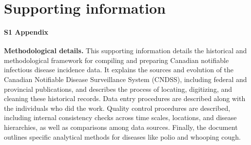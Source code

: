 \documentclass[10pt,letterpaper]{article}
\begin{document}
\section*{Supporting information}

\paragraph*{S1 Appendix}\label{S1_Appendix}
{\bf Methodological details.} This supporting information details the historical and methodological framework for compiling and preparing Canadian notifiable infectious disease incidence data. It explains the sources and evolution of the Canadian Notifiable Disease Surveillance System (CNDSS), including federal and provincial publications, and describes the process of locating, digitizing, and cleaning these historical records. Data entry procedures are described along with the individuals who did the work. Quality control procedures are described, including internal consistency checks across time scales, locations, and disease hierarchies, as well as comparisons among data sources. Finally, the document outlines specific analytical methods for diseases like polio and whooping cough.





\end{document}
